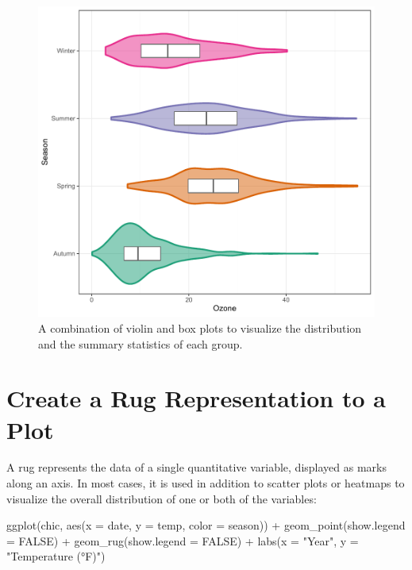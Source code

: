 \documentclass[
]{krantz}
\makeatletter
\newenvironment{Shaded}{\begin{snugshade}}{\end{snugshade}}
\newcommand{\AttributeTok}[1]{\textcolor[rgb]{0.61,0.61,0.61}{#1}}
\newcommand{\ConstantTok}[1]{\textcolor[rgb]{0,0,0}{#1}}
\newcommand{\FunctionTok}[1]{\textcolor[rgb]{0,0,0}{#1}}
\newcommand{\NormalTok}[1]{#1}
\newcommand{\SpecialCharTok}[1]{\textcolor[rgb]{0,0,0}{#1}}
\newcommand{\StringTok}[1]{\textcolor[rgb]{0.5,0.5,0.5}{#1}}
\newenvironment{kframe}{%
\medskip{}
\setlength{\fboxsep}{.8em}
 \def\at@end@of@kframe{}%
 \ifinner\ifhmode%
  \def\at@end@of@kframe{\end{minipage}}%
  \begin{minipage}{\columnwidth}%
 \fi\fi%
 \def\FrameCommand##1{\hskip\@totalleftmargin \hskip-\fboxsep
 \colorbox{shadecolor}{##1}\hskip-\fboxsep
     \hskip-\linewidth \hskip-\@totalleftmargin \hskip\columnwidth}%
 \MakeFramed {\advance\hsize-\width
   \@totalleftmargin\z@ \linewidth\hsize
   \@setminipage}}%
 {\par\unskip\endMakeFramed%
 \at@end@of@kframe}
\renewenvironment{Shaded}{\begin{kframe}}{\end{kframe}}
\makeatother
\begin{document}
\begin{figure}
\centering
\includegraphics{bookdown_files/figure-latex/violin-jitter-box-1.pdf}
\caption{\label{fig:violin-jitter-box}A combination of violin and box plots to visualize the distribution and the summary statistics of each group.}
\end{figure}

\hypertarget{create-a-rug-representation-to-a-plot}{%
\section{Create a Rug Representation to a Plot}\label{create-a-rug-representation-to-a-plot}}

A rug represents the data of a single quantitative variable, displayed as marks along an axis. In most cases, it is used in addition to scatter plots or heatmaps to visualize the overall distribution of one or both of the variables:

\begin{Shaded}
\begin{Highlighting}[]
\FunctionTok{ggplot}\NormalTok{(chic, }\FunctionTok{aes}\NormalTok{(}\AttributeTok{x =}\NormalTok{ date, }\AttributeTok{y =}\NormalTok{ temp,}
                 \AttributeTok{color =}\NormalTok{ season)) }\SpecialCharTok{+}
  \FunctionTok{geom\_point}\NormalTok{(}\AttributeTok{show.legend =} \ConstantTok{FALSE}\NormalTok{) }\SpecialCharTok{+}
  \FunctionTok{geom\_rug}\NormalTok{(}\AttributeTok{show.legend =} \ConstantTok{FALSE}\NormalTok{) }\SpecialCharTok{+}
  \FunctionTok{labs}\NormalTok{(}\AttributeTok{x =} \StringTok{"Year"}\NormalTok{, }\AttributeTok{y =} \StringTok{"Temperature (°F)"}\NormalTok{)}
\end{Highlighting}
\end{Shaded}
\end{document}
